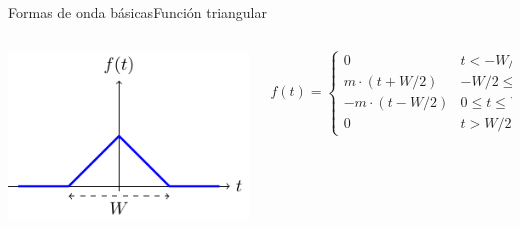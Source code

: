 \documentclass[aspectratio=169, xcolor={usenames,svgnames,dvipsnames}]{beamer}
\begin{document}
\begin{frame}{Formas de onda básicas}{Función triangular}
\begin{columns}
\begin{column}{0.4\columnwidth}
\begin{center}
\includegraphics[width=.9\linewidth]{../figs/triangular.pdf}
\end{center}
\end{column}

\begin{column}{0.6\columnwidth}
\[
  f(t) = %
  \begin{cases}
    0 & t < -W/2\\
    m \cdot (t + W/2)  & -W/2 \leq t \leq 0\\
    -m \cdot (t - W/2)  & 0 \leq t \leq W/2\\
    0  & t > W/2
  \end{cases}
  \]
\end{column}
\end{columns}
\end{frame}
\end{document}
